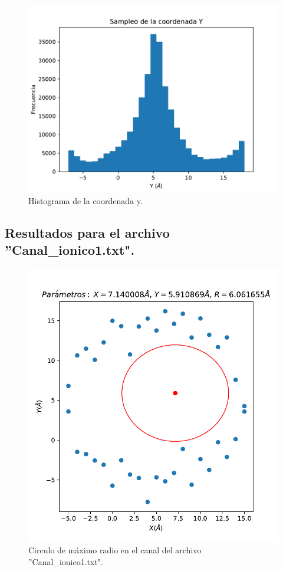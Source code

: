 \documentclass[12pt,letterpaper]{article}
\begin{document}
\begin{figure}[H]
\includegraphics{y_hist.pdf}
\caption{Histograma de la coordenada y.}
\centering
\end{figure}

\subsection{Resultados para el archivo ''Canal\_ionico1.txt". }

\begin{figure}[H]
\includegraphics{canal1.pdf}
\caption{Circulo de máximo radio en el canal del archivo ''Canal\_ionico1.txt".}
\centering
\end{figure}
\end{document}
